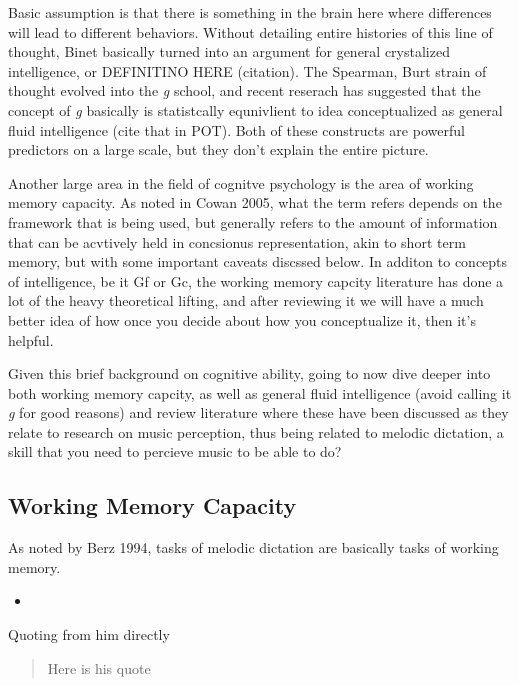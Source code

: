 \documentclass[]{book}
\providecommand{\tightlist}{%
  \setlength{\itemsep}{0pt}\setlength{\parskip}{0pt}}
\theoremstyle{definition}
\theoremstyle{definition}
\theoremstyle{definition}
\theoremstyle{remark}
\begin{document}
Basic assumption is that there is something in the brain here where
differences will lead to different behaviors. Without detailing entire
histories of this line of thought, Binet basically turned into an
argument for general crystalized intelligence, or DEFINITINO HERE
(citation). The Spearman, Burt strain of thought evolved into the
\emph{g} school, and recent reserach has suggested that the concept of
\emph{g} basically is statistcally equnivlient to idea conceptualized as
general fluid intelligence (cite that in POT). Both of these constructs
are powerful predictors on a large scale, but they don't explain the
entire picture.

Another large area in the field of cognitve psychology is the area of
working memory capacity. As noted in Cowan 2005, what the term refers
depends on the framework that is being used, but generally refers to the
amount of information that can be acvtively held in concsionus
representation, akin to short term memory, but with some important
caveats discssed below. In additon to concepts of intelligence, be it Gf
or Gc, the working memory capcity literature has done a lot of the heavy
theoretical lifting, and after reviewing it we will have a much better
idea of how once you decide about how you conceptualize it, then it's
helpful.

Given this brief background on cognitive ability, going to now dive
deeper into both working memory capcity, as well as general fluid
intelligence (avoid calling it \emph{g} for good reasons) and review
literature where these have been discussed as they relate to research on
music perception, thus being related to melodic dictation, a skill that
you need to percieve music to be able to do?

\hypertarget{working-memory-capacity}{%
\subsection{Working Memory Capacity}\label{working-memory-capacity}}

As noted by Berz 1994, tasks of melodic dictation are basically tasks of
working memory.

\begin{itemize}
\tightlist
\item
  \citep{berzWorkingMemoryMusic1995}
\end{itemize}

Quoting from him directly

\begin{quote}
Here is his quote
\end{quote}
\end{document}
